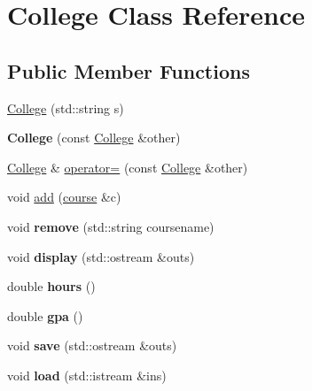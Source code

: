 \hypertarget{classCollege}{}\section{College Class Reference}
\label{classCollege}
\subsection*{Public Member Functions}
\begin{DoxyCompactItemize}
\item 
\hyperlink{classCollege_adabaf4087355e83f9f7d39f1e1498b41}{College} (std\+::string s)
\item 
\mbox{\label{classCollege_ad007ad488e5a7ef986114080d0c8e101}} 
{\bfseries College} (const \hyperlink{classCollege}{College} \&other)
\item 
\hyperlink{classCollege}{College} \& \hyperlink{classCollege_af2194c9b37f80d13dc3fdba6784b18e8}{operator=} (const \hyperlink{classCollege}{College} \&other)
\item 
void \hyperlink{classCollege_a67fd1d8970b46b24ce2e0dd72598a22f}{add} (\hyperlink{classcourse}{course} \&c)
\item 
\mbox{\label{classCollege_a4d2ae513b36e6421fb1ca2c08459cfe6}} 
void {\bfseries remove} (std\+::string coursename)
\item 
\mbox{\label{classCollege_a52ca0a164483cf5c05591cd0fb8b300c}} 
void {\bfseries display} (std\+::ostream \&outs)
\item 
\mbox{\label{classCollege_a8a7a762611a1d7e00c453390d49355fd}} 
double {\bfseries hours} ()
\item 
\mbox{\label{classCollege_aaf9bfaa0bc717e96da6365661a96fcd0}} 
double {\bfseries gpa} ()
\item 
\mbox{\label{classCollege_af6b419f813bc990c0e11f99b78a26899}} 
void {\bfseries save} (std\+::ostream \&outs)
\item 
\mbox{\label{classCollege_a11422094ddd907705daede7aa537dd73}} 
void {\bfseries load} (std\+::istream \&ins)
\end{DoxyCompactItemize}


